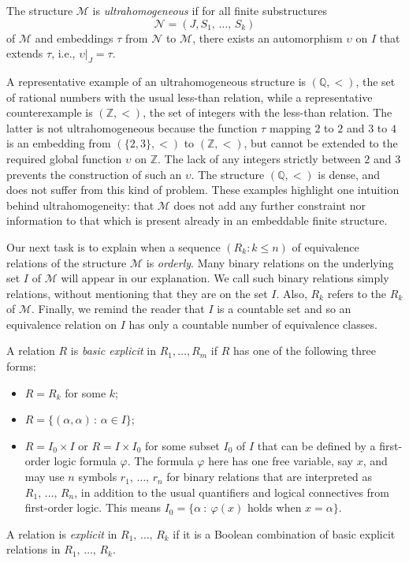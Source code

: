 \documentclass[AHL,Unicode,longabstracts,published]{cedram}
\newcommand*\Q{\mathbb{Q}}
\newcommand*\Z{\mathbb{Z}}
\newcommand*\NN{\mathcal{N}}
\newcommand*\MM{\mathcal{M}}
\begin{document}
\begin{defi}\label{def: ultrahomogeneity}
The structure $\MM$ is \emph{ultrahomogeneous} if for all finite substructures
\[
\NN = (J,S_1,\,\ldots,\,S_k)
\]
of $\MM$ and embeddings $\tau$ from $\NN$ to $\MM$, there exists an automorphism $\upsilon$ on $I$ that extends $\tau$, i.e., $\upsilon|_J = \tau$.
\end{defi}

A representative example of an ultrahomogeneous structure is $(\Q,<)$, the set of rational numbers with the usual less-than relation, while a representative counterexample is $(\Z,<)$, the set of integers with the less-than relation. The latter is not ultrahomogeneous because the function $\tau$ mapping $2$ to $2$ and $3$ to $4$ is an embedding from $(\{2,3\},<)$ to $(\Z,<)$, but cannot be extended to the required global function $\upsilon$ on $\Z$. The lack of any integers strictly between $2$ and $3$ prevents the construction of such an $\upsilon$. The structure $(\Q,<)$ is dense, and does not suffer from this kind of problem. These examples highlight one intuition behind ultrahomogeneity: that $\MM$ does not add any further constraint nor information to that which is present already in an embeddable finite structure.

Our next task is to explain when a sequence $(R_k : k \leq n)$ of equivalence relations of the structure $\MM$ is \emph{orderly}. Many binary relations on the underlying set $I$ of $\MM$ will appear in our explanation. We call such binary relations simply relations, without mentioning that they are on the set $I$. Also, $R_k$ refers to the $R_k$ of $\MM$. Finally, we remind the reader that $I$ is a countable set and so an equivalence relation on $I$ has only a countable number of equivalence classes.

\begin{defi}\label{def: explicit}
A relation $R$ is \emph{basic explicit} in $R_1,\ldots,R_m$ if $R$ has one of the following three forms:
\begin{itemize}
\item $R = R_k$ for some $k$;
\item $R = \{(\alpha,\alpha)\,:\,\alpha \in I\}$;
\item $R = I_0 \times I$ or $R = I \times I_0$ for some subset $I_0$ of $I$ that can be defined by a first-order logic formula $\varphi$. The formula $\varphi$ here has one free variable, say $x$, and may use $n$ symbols $r_1,\,\ldots,\,r_n$ for binary relations that are interpreted as $R_1,\,\ldots,\,R_n$, in addition to the usual quantifiers and logical connectives from first-order logic. This means $I_0 = \{ \alpha~:~\varphi(x)$ holds when $x=\alpha\}$.
\end{itemize}
A relation is \emph{explicit} in $R_1,\,\ldots,\,R_k$ if it is a Boolean combination of basic explicit relations in $R_1,\,\ldots,\,R_k$.
\end{defi}
\end{document}
